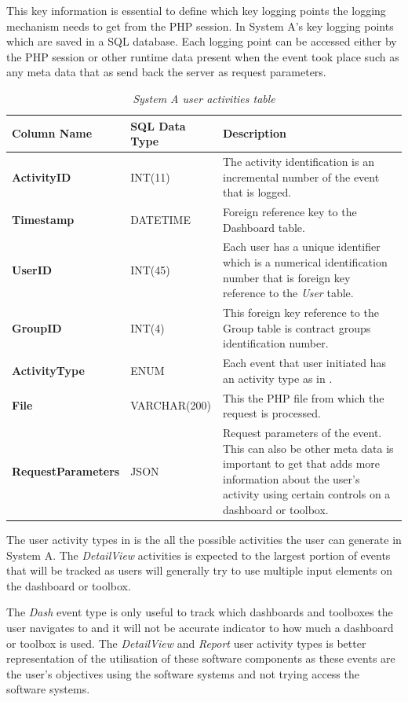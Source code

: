 This key information is essential to define which key logging points the logging mechanism needs to get from the PHP session. In  System A's key logging points which are saved in a SQL database. Each logging point can be accessed either by the PHP session or other runtime data present when the event took place such as any meta data that as send back the server as request parameters.

\begin{table}[!htb]
	\centering
	\small
	\caption[Logging points]
	{\textit{System A user activities table}}
	\label{tbl:Ch2_System_A_Logging_Points}
	\begin{tabularx}{\textwidth}{|l|l|X|}
		\hline \textbf{Column Name} & \textbf{SQL Data Type} & \textbf{Description} \\
		\hline \textbf{ActivityID} & INT(11) & The activity identification is an incremental number of the event that is logged.\\
		\hline \textbf{Timestamp} & DATETIME & Foreign reference key to the Dashboard table.\\
		\hline \textbf{UserID} & INT(45) & Each user has a unique identifier which is a numerical identification number that is foreign key reference to the \emph{User} table.\\
		\hline \textbf{GroupID} & INT(4) & This foreign key reference to the Group table is contract groups identification number. \\ 		
		\hline \textbf{ActivityType} & ENUM & Each event that user initiated has an activity type as in \Cref{tbl:Ch2_SystemA_EventTypes}. \\
		\hline \textbf{File} & VARCHAR(200) & This the PHP file from which the request is processed.\\
		\hline \textbf{RequestParameters} & JSON & Request parameters of the event. This can also be other meta data is important to get that adds more information about the user's activity using certain controls on a dashboard or toolbox. \\
		\hline
	\end{tabularx}
\end{table}

\clearpage

The user activity types in  is the all the possible activities the user can generate in System A. The \emph{DetailView} activities is expected to the largest portion of events that will be tracked as users will generally try to use multiple input elements on the dashboard or toolbox. \par The \emph{Dash} event type is only useful to track which dashboards and toolboxes the user navigates to and it will not be accurate indicator to how much a dashboard or toolbox is used. The \emph{DetailView} and \emph{Report} user activity types is better representation of the utilisation of these software components as these events are the user's objectives using the software systems and not trying access the software systems.  


